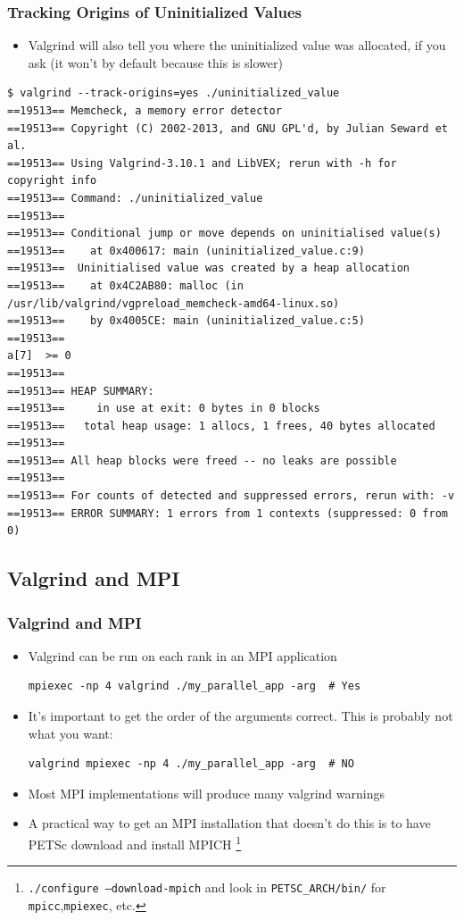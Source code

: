 \documentclass{beamer}
\begin{document}
\begin{frame}[fragile]
  \frametitle{Tracking Origins of Uninitialized Values}
  \begin{itemize}
    \item Valgrind will also tell you where the uninitialized value was allocated, if you ask (it won't by default because this is slower)
  \end{itemize}
  \begin{lstlisting}
$ valgrind --track-origins=yes ./uninitialized_value
==19513== Memcheck, a memory error detector
==19513== Copyright (C) 2002-2013, and GNU GPL'd, by Julian Seward et al.
==19513== Using Valgrind-3.10.1 and LibVEX; rerun with -h for copyright info
==19513== Command: ./uninitialized_value
==19513==
==19513== Conditional jump or move depends on uninitialised value(s)
==19513==    at 0x400617: main (uninitialized_value.c:9)
==19513==  Uninitialised value was created by a heap allocation
==19513==    at 0x4C2AB80: malloc (in /usr/lib/valgrind/vgpreload_memcheck-amd64-linux.so)
==19513==    by 0x4005CE: main (uninitialized_value.c:5)
==19513==
a[7]  >= 0
==19513==
==19513== HEAP SUMMARY:
==19513==     in use at exit: 0 bytes in 0 blocks
==19513==   total heap usage: 1 allocs, 1 frees, 40 bytes allocated
==19513==
==19513== All heap blocks were freed -- no leaks are possible
==19513==
==19513== For counts of detected and suppressed errors, rerun with: -v
==19513== ERROR SUMMARY: 1 errors from 1 contexts (suppressed: 0 from 0)
  \end{lstlisting}
\end{frame}

\subsection{Valgrind and MPI}

\begin{frame}[fragile]
\frametitle{Valgrind and MPI}
\begin{itemize}
\item Valgrind can be run on each rank in an MPI application
\begin{lstlisting}
mpiexec -np 4 valgrind ./my_parallel_app -arg  # Yes
\end{lstlisting}
\item It's important  to get the order of the arguments correct. This is probably not what you want:
\begin{lstlisting}
valgrind mpiexec -np 4 ./my_parallel_app -arg  # NO
\end{lstlisting}
\item Most MPI implementations will produce many valgrind warnings
\item A practical way to get an MPI installation that doesn't do this is to have PETSc download and install MPICH \footnote{\texttt{./configure --download-mpich} and look in \texttt{PETSC\_ARCH/bin/} for \texttt{mpicc},\texttt{mpiexec}, etc.}
\end{itemize}
\end{frame}
\end{document}
